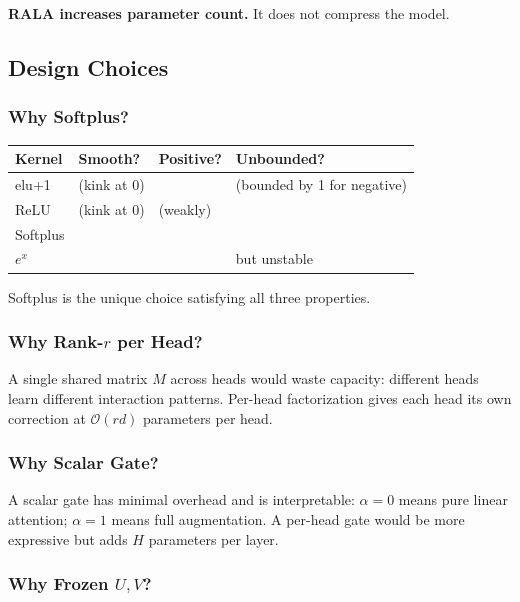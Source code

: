 \textbf{RALA increases parameter count.} It does not compress the model.

\subsection{Design Choices}

\subsubsection{Why Softplus?}

\begin{table}[H]
\centering
\small
\begin{tabular}{llll}
\toprule
\textbf{Kernel} & \textbf{Smooth?} & \textbf{Positive?} & \textbf{Unbounded?} \\
\midrule
elu+1 & (kink at 0) &  & (bounded by 1 for negative) \\
ReLU & (kink at 0) & (weakly) &  \\
Softplus &  &  &  \\
$e^x$ &  &  & but unstable \\
\bottomrule
\end{tabular}
\end{table}

Softplus is the unique choice satisfying all three properties.

\subsubsection{Why Rank-$r$ per Head?}

A single shared matrix $M$ across heads would waste capacity: different heads 
learn different interaction patterns. Per-head factorization gives each head 
its own correction at $\mathcal{O}(r d)$ parameters per head.

\subsubsection{Why Scalar Gate?}

A scalar gate has minimal overhead and is interpretable: $\alpha = 0$ means 
pure linear attention; $\alpha = 1$ means full augmentation. A per-head gate 
would be more expressive but adds $H$ parameters per layer.

\subsubsection{Why Frozen $U, V$?}

